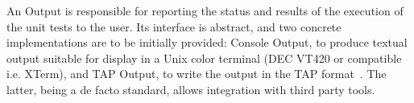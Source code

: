 An \textsf{Output} is responsible for reporting the status and results of the
execution of the unit tests to the user. Its interface is abstract, and two
concrete implementations are to be initially provided: \textsf{Console
Output}, to  produce textual output suitable for display in a Unix color
terminal (DEC VT420 or compatible i.e. XTerm), and \textsf{TAP Output}, to
write the output in the \gls{TAP} format~\cite{tap-spec}. The latter, being
a de facto standard, allows integration with third party tools.

\beforeintro
